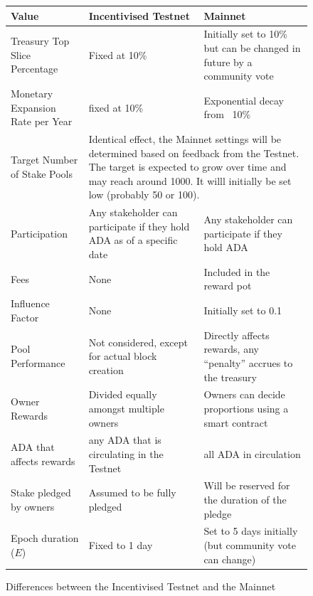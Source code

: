 \documentclass[11pt,a4paper,dvipsnames,twosided,final]{article}
\begin{document}
\begin{figure}[h!]
\begin{center}
\begin{tabular}{||l|p{4cm}|p{4cm}||}
  \hline\hline
  \textbf{Value} & \textbf{Incentivised Testnet} & \textbf{Mainnet}
                                              \\\hline
Treasury Top Slice Percentage
& Fixed at 10\%
& Initially set to 10\% but can be changed in future by a community vote
                                              \\\hline
Monetary Expansion Rate per Year
& fixed at 10\%
& Exponential decay from ~10\%
                                              \\\hline
 Target Number of Stake Pools
                 &
\multicolumn{2}{|p{8cm}||}{
Identical effect, the Mainnet settings will be determined based on feedback from the Testnet.
The target is expected to grow over time and may reach around 1000.
It willl initially be set low (probably 50 or 100).}
                                              \\\hline
Participation
& Any stakeholder can participate if they hold ADA as of a specific date
& Any stakeholder can participate if they hold ADA
                                              \\\hline
Fees
& None
& Included in the reward pot
                                              \\\hline
Influence Factor
& None
& Initially set to 0.1
                                              \\\hline
Pool Performance
& Not considered, except for actual block creation
& Directly affects rewards, any ``penalty'' accrues to the treasury
                                              \\\hline
Owner Rewards
& Divided equally amongst multiple owners
& Owners can decide proportions using a smart contract
                                              \\\hline
ADA that affects rewards
& any ADA that is circulating in the Testnet
& all ADA in circulation
                                              \\\hline
Stake pledged by owners
& Assumed to be fully pledged
& Will be reserved for the duration of the pledge
                                              \\\hline
Epoch duration ($E$)
& Fixed to 1 day
& Set to 5 days initially (but community vote can change)
                                              \\\hline
\hline
\end{tabular}
\end{center}
\caption{Differences between the Incentivised Testnet and the Mainnet}
\end{figure}

\clearpage


\end{document}
